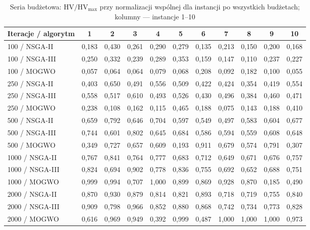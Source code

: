 \begin{table}[htbp]
    \centering
    \caption{Seria budżetowa: $\mathrm{HV}/\mathrm{HV}_{\max}$ przy normalizacji wspólnej dla instancji po wszystkich budżetach; kolumny --- instancje 1--10}
    \label{tab:per_run_budget}
    \begin{tabular}{l c c c c c c c c c c }
        \hline
        Iteracje / algorytm & 1 & 2 & 3 & 4 & 5 & 6 & 7 & 8 & 9 & 10 \\
        \hline
        100 / NSGA-II & 0{,}183 & 0{,}430 & 0{,}261 & 0{,}290 & 0{,}279 & 0{,}135 & 0{,}213 & 0{,}150 & 0{,}200 & 0{,}168 \\
        100 / NSGA-III & 0{,}250 & 0{,}332 & 0{,}239 & 0{,}289 & 0{,}353 & 0{,}159 & 0{,}147 & 0{,}110 & 0{,}237 & 0{,}227 \\
        100 / MOGWO & 0{,}057 & 0{,}064 & 0{,}064 & 0{,}079 & 0{,}068 & 0{,}208 & 0{,}092 & 0{,}182 & 0{,}100 & 0{,}055 \\
        250 / NSGA-II & 0{,}403 & 0{,}650 & 0{,}491 & 0{,}556 & 0{,}509 & 0{,}422 & 0{,}424 & 0{,}354 & 0{,}419 & 0{,}554 \\
        250 / NSGA-III & 0{,}558 & 0{,}517 & 0{,}610 & 0{,}493 & 0{,}526 & 0{,}430 & 0{,}496 & 0{,}384 & 0{,}460 & 0{,}471 \\
        250 / MOGWO & 0{,}238 & 0{,}108 & 0{,}162 & 0{,}115 & 0{,}465 & 0{,}188 & 0{,}075 & 0{,}143 & 0{,}188 & 0{,}410 \\
        500 / NSGA-II & 0{,}659 & 0{,}792 & 0{,}646 & 0{,}704 & 0{,}597 & 0{,}549 & 0{,}497 & 0{,}583 & 0{,}604 & 0{,}677 \\
        500 / NSGA-III & 0{,}744 & 0{,}601 & 0{,}802 & 0{,}645 & 0{,}684 & 0{,}586 & 0{,}594 & 0{,}559 & 0{,}608 & 0{,}648 \\
        500 / MOGWO & 0{,}349 & 0{,}727 & 0{,}657 & 0{,}609 & 0{,}193 & 0{,}911 & 0{,}679 & 0{,}574 & 0{,}791 & 0{,}307 \\
        1000 / NSGA-II & 0{,}767 & 0{,}841 & 0{,}764 & 0{,}777 & 0{,}683 & 0{,}712 & 0{,}649 & 0{,}671 & 0{,}676 & 0{,}757 \\
        1000 / NSGA-III & 0{,}824 & 0{,}694 & 0{,}902 & 0{,}778 & 0{,}836 & 0{,}755 & 0{,}692 & 0{,}652 & 0{,}688 & 0{,}751 \\
        1000 / MOGWO & 0{,}999 & 0{,}994 & 0{,}707 & 1{,}000 & 0{,}899 & 0{,}869 & 0{,}928 & 0{,}870 & 0{,}185 & 0{,}490 \\
        2000 / NSGA-II & 0{,}870 & 0{,}930 & 0{,}879 & 0{,}814 & 0{,}821 & 0{,}893 & 0{,}718 & 0{,}719 & 0{,}755 & 0{,}840 \\
        2000 / NSGA-III & 0{,}909 & 0{,}798 & 0{,}966 & 0{,}852 & 0{,}880 & 0{,}868 & 0{,}742 & 0{,}734 & 0{,}773 & 0{,}828 \\
        2000 / MOGWO & 0{,}616 & 0{,}969 & 0{,}949 & 0{,}392 & 0{,}999 & 0{,}487 & 1{,}000 & 1{,}000 & 1{,}000 & 0{,}973 \\
        \hline
    \end{tabular}
\end{table}

